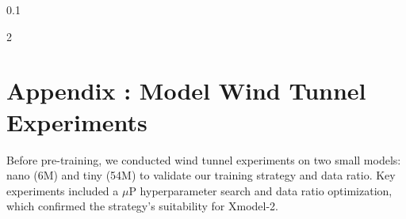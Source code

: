 \documentclass{article}
\newcommand{\llm}{Xmodel-2\xspace}
\begin{document}



%   
\begin{spacing}{0.1} %
\footnotesize %
\begin{multicols}{2} %

\end{multicols}
\end{spacing}

\section{Appendix : Model Wind Tunnel Experiments}
\label{Appendix:Model Wind Tunnel Experiments}

Before pre-training, we conducted wind tunnel experiments on two small models: nano (6M) and tiny (54M) to validate our training strategy and data ratio. Key experiments included a $\mu$P hyperparameter search and data ratio optimization, which confirmed the strategy's suitability for \llm.

\end{document}
